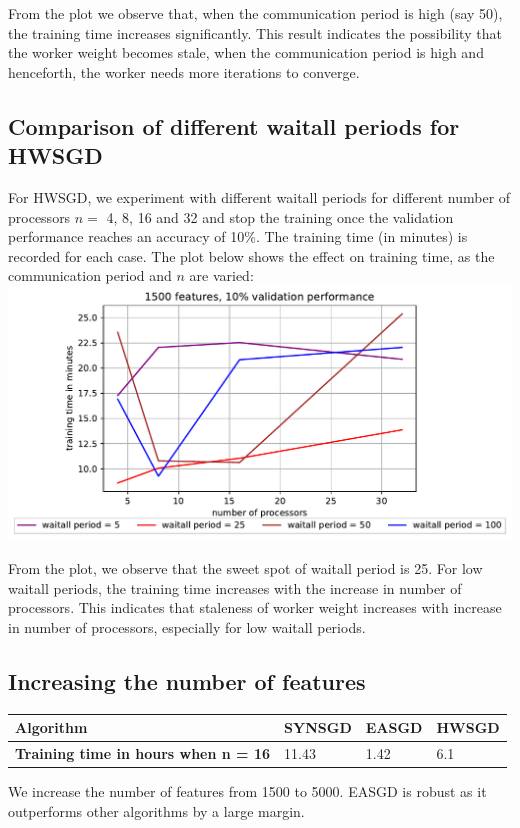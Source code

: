 \documentclass[12pt]{article}
\begin{document}
From the plot we observe that, when the communication period is high (say 50), the training time increases significantly. This result indicates the possibility that the worker weight becomes stale, when the communication period is high and henceforth, the worker needs more iterations to converge.

\subsection{Comparison of different waitall periods for HWSGD}
For HWSGD, we experiment with different waitall periods for different number of processors $n=$ 4, 8, 16 and 32 and stop the training once the validation performance reaches an accuracy of 10\%. The  training  time (in  minutes)  is  recorded  for  each  case. The plot below shows the effect on training time, as the communication period and $n$ are varied:\\

{\centering
\includegraphics[width=14cm]{images/1500f_10v_hw.pdf}\\
}

From the plot, we observe that the sweet spot of waitall period is 25. For low waitall periods, the training time increases with the increase in number of processors. This indicates that staleness of worker weight increases with increase in number of processors, especially for low waitall periods.


\subsection{Increasing the number of features}
\begin{table}[ht]
\centering
 \begin{tabular}{llll} 
 \toprule
\textbf{Algorithm} & SYNSGD & EASGD & HWSGD \\ \midrule
\textbf{Training time in hours when n = 16} & 11.43 & 1.42 & 6.1 \\
\bottomrule
\end{tabular}
\end{table}
We increase the number of features from 1500 to 5000. EASGD is robust as it outperforms other algorithms by a large margin. 
\end{document}
